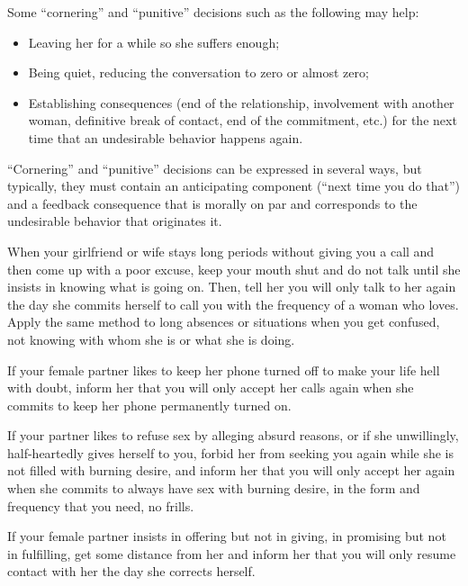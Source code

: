 \par Some \enquote{cornering} and \enquote{punitive} decisions such as the following may help:
\begin{itemize}
	\item Leaving her for a while so she suffers enough;
	\item Being quiet, reducing the conversation to zero or almost zero;
	\item Establishing consequences (end of the relationship, involvement with another woman, definitive break of contact, end of the commitment, etc.) for the next time that an undesirable behavior happens again.
\end{itemize}

\par \enquote{Cornering} and \enquote{punitive} decisions can be expressed in several ways, but typically, they must contain an anticipating component (\enquote{next time you do that}) and a feedback consequence that is morally on par and corresponds to the undesirable behavior that originates it.

\par When your girlfriend or wife stays long periods without giving you a call and then come up with a poor excuse, keep your mouth shut and do not talk until she insists in knowing what is going on. Then, tell her you will only talk to her again the day she commits herself to call you with the frequency of a woman who loves. Apply the same method to long absences or situations when you get confused, not knowing with whom she is or what she is doing.

\par If your female partner likes to keep her phone turned off to make your life hell with doubt, inform her that you will only accept her calls again when she commits to keep her phone permanently turned on.

\par If your partner likes to refuse sex by alleging absurd reasons, or if she unwillingly, half-heartedly gives herself to you, forbid her from seeking you again while she is not filled with burning desire, and inform her that you will only accept her again when she commits to always have sex with burning desire, in the form and frequency that you need, no frills.

\par If your female partner insists in offering but not in giving, in promising but not in fulfilling, get some distance from her and inform her that you will only resume contact with her the day she corrects herself.

